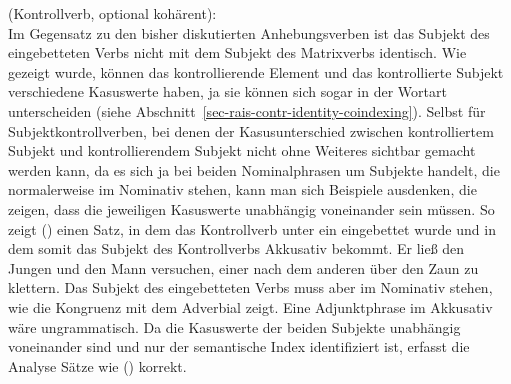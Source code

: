 {\eas
\label{le-versuchen-incoh}%
 (Kontrollverb, optional kohärent):\\
%
\zs
Im Gegensatz zu den bisher diskutierten Anhebungsverben ist das Subjekt des eingebetteten Verbs
nicht mit dem Subjekt des Matrixverbs identisch. Wie gezeigt wurde, können das kontrollierende
Element und das kontrollierte Subjekt verschiedene Kasuswerte haben, ja sie können sich sogar
in der Wortart unterscheiden (siehe Abschnitt~\ref{sec-rais-contr-identity-coindexing}).
Selbst für Subjektkontrollverben, bei denen der Kasusunterschied zwischen kontrolliertem
Subjekt und kontrollierendem Subjekt nicht ohne Weiteres sichtbar gemacht werden kann, da
es sich ja bei beiden Nominalphrasen um Subjekte handelt, die normalerweise im Nominativ
stehen, kann man sich Beispiele ausdenken, die zeigen, dass die jeweiligen Kasuswerte
unabhängig voneinander sein müssen. So zeigt () einen Satz, in dem das Kontrollverb
unter ein \aciv eingebettet wurde und in dem somit das Subjekt des Kontrollverbs Akkusativ bekommt.
%
%
\ea
Er ließ den Jungen und den Mann versuchen, einer nach dem anderen über den Zaun zu klettern.
\z
Das Subjekt des eingebetteten Verbs muss aber im Nominativ stehen, wie die Kongruenz mit dem Adverbial zeigt.
Eine Adjunktphrase im Akkusativ wäre ungrammatisch. Da die Kasuswerte der beiden Subjekte unabhängig voneinander sind
und nur der semantische Index identifiziert ist, erfasst die Analyse Sätze wie () korrekt.

}

